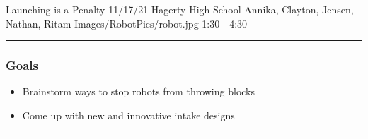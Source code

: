 \insertmeeting 
	{Launching is a Penalty} 
	{11/17/21}
	{Hagerty High School}
	{Annika, Clayton, Jensen, Nathan, Ritam}
	{Images/RobotPics/robot.jpg}
	{1:30 - 4:30}
	
\noindent\hfil\rule{\textwidth}{.4pt}\hfil
\subsubsection*{Goals}
\begin{itemize}
    \item Brainstorm ways to stop robots from throwing blocks
    \item Come up with new and innovative intake designs


\end{itemize} 

\noindent\hfil\rule{\textwidth}{.4pt}\hfil

